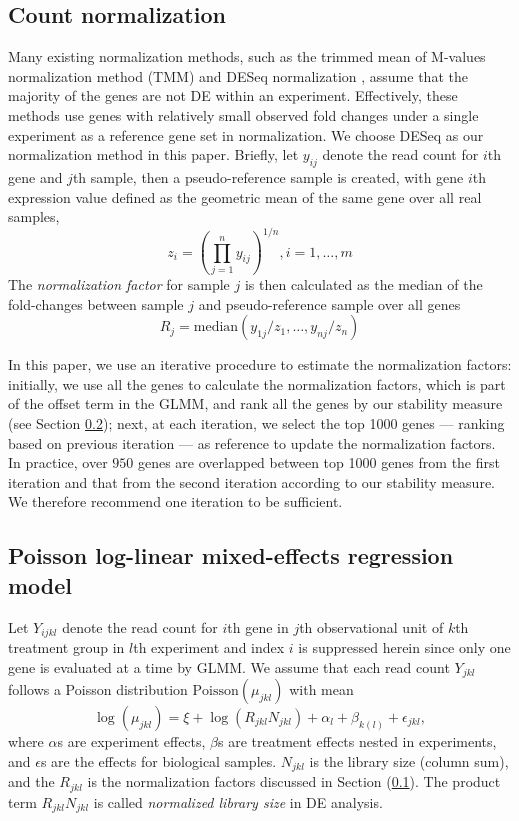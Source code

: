 \documentclass[11pt, a4paper]{article}
\begin{document}
\subsection{Count normalization}\label{section:countNormalization}

Many existing normalization methods, such as the trimmed mean of M-values normalization method (TMM) \citep{robinson2010scaling} and DESeq normalization \citep{anders2010differential}, assume that the majority of the genes are not DE within an experiment. Effectively, these methods use genes with relatively small observed fold changes under a single experiment as a reference gene set in normalization. We choose DESeq \citep{anders2010differential} as our normalization method in this paper. Briefly, let $y_{ij}$ denote the read count for $i$th gene and $j$th sample, then a pseudo-reference sample is created, with gene $i$th expression value defined as the geometric mean of the same gene over all real samples, 
\[ z_i = (\prod_{j=1}^ny_{ij})^{1/n},  i=1, \ldots, m \]
 The \textit{normalization factor} for sample $j$ is then calculated as the median of the fold-changes between sample $j$ and pseudo-reference sample over all genes
  \[R_j = \text{median}(y_{1j}/z_1, \ldots, y_{nj}/z_n)\]

In this paper, we use an iterative procedure to estimate the normalization factors: initially, we use all the genes to calculate the normalization factors, which is part of the offset term in the GLMM, and rank all the genes by our stability measure (see Section \ref{subsection:OurMethod}); next, at each iteration, we select the top 1000 genes ---  ranking based on previous iteration --- as reference to update the normalization factors. In practice, over $950$ genes are overlapped between top 1000 genes from the first iteration and that from the second iteration according to our stability measure. We therefore recommend one iteration to be sufficient.  

\subsection{Poisson log-linear mixed-effects regression model}\label{subsection:OurMethod} 

Let $Y_{ijkl}$ denote the read count for $i$th gene
in $j$th observational unit of $k$th treatment group in $l$th experiment
and index $i$ is suppressed herein since only one gene is evaluated at a time
by GLMM. We assume that each read count $Y_{jkl}$ follows a Poisson
distribution $\text{Poisson}(\mu_{jkl})$ with mean
\begin{equation}\label{eq:GLMM}
    \log( \mu_{jkl}) = \xi + \log(R_{jkl}N_{jkl})+ \alpha_l + \beta_{k(l)} + \epsilon_{jkl},
\end{equation}
where $\alpha$s are experiment effects,  $\beta$s are treatment effects
nested in experiments, and $\epsilon$s are the effects for biological samples. 
$N_{jkl}$ is the library size (column sum), and the $R_{jkl}$ is the normalization factors discussed in Section (\ref{section:countNormalization}). The product term $R_{jkl}N_{jkl}$ is called \textit{normalized library size} in DE analysis. 
\end{document}
